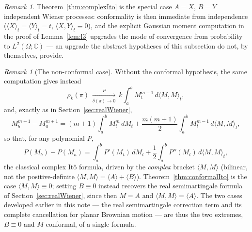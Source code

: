 \documentclass[11pt,fleqn]{article}
\def\C{\mathbb C}
\theoremstyle{plain}
\theoremstyle{remark}
\newtheorem{remark}[thm]{Remark}
\begin{document}
\begin{remark}
Theorem~\ref{thm:complexIto} is the special case $A=X$, $B=Y$ independent
Wiener processes: conformality is then immediate from independence
($\langle X\rangle_t=\langle Y\rangle_t=t$, $\langle X,Y\rangle_t\equiv0$),
and the explicit Gaussian moment computation in the proof of
Lemma~\ref{lem:l3} upgrades the mode of convergence from probability to
$L^2(\Omega;\C)$ — an upgrade the abstract hypotheses of this subsection
do not, by themselves, provide.
\end{remark}

\begin{remark}[The non-conformal case]
Without the conformal hypothesis, the same computation gives instead
\[
\rho_k(\pi)\ \xrightarrow[\delta(\pi)\to0]{P}\ k\int_a^bM_t^{m-1}\,d\langle
M,M\rangle_t,
\]
and, exactly as in Section~\ref{sec:realWiener},
\[
M_b^{m+1}-M_a^{m+1}=(m+1)\int_a^bM_t^m\,dM_t+\frac{m(m+1)}2\int_a^bM_t^{m-1}\,d\langle
M,M\rangle_t,
\]
so that, for any polynomial $P$,
\[
P(M_b)-P(M_a)=\int_a^bP'(M_t)\,dM_t+\frac12\int_a^bP''(M_t)\,d\langle
M,M\rangle_t,
\]
the classical complex It\^o formula, driven by the \emph{complex}
bracket $\langle M,M\rangle$ (bilinear, not the positive-definite
$\langle M,\overline M\rangle=\langle A\rangle+\langle B\rangle$).
Theorem~\ref{thm:conformalIto} is the case $\langle M,M\rangle\equiv0$;
setting $B\equiv0$ instead recovers the real semimartingale formula of
Section~\ref{sec:realWiener}, since then $M=A$ and $\langle
M,M\rangle=\langle A\rangle$. The two cases developed earlier in this
note — the real semimartingale correction term and its complete
cancellation for planar Brownian motion — are thus the two extremes,
$B\equiv0$ and $M$ conformal, of a single formula.
\end{remark}
\end{document}
